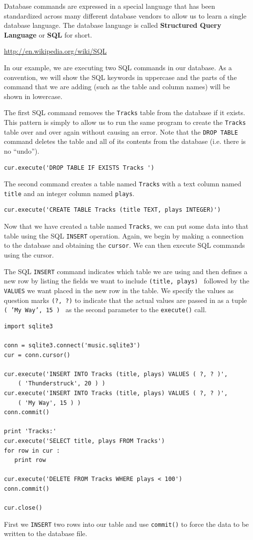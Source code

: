 \documentclass[11pt]{book}
\begin{document}
Database commands are expressed in a special language that has 
been standardized across many different database vendors 
to allow us to learn a single database language.   The database
language is called {\bf Structured Query Language} or {\bf SQL}
for short.

\url{http://en.wikipedia.org/wiki/SQL}

In our example, we are executing two SQL commands in our database.
As a convention, we will show the SQL keywords in uppercase 
and the parts of the command that we are adding (such as the
table and column names) will be shown in lowercase.

The first SQL command removes the {\tt Tracks} table from the 
database if it exists.  This pattern is simply to allow us to 
run the same program to create the {\tt Tracks} table over 
and over again without causing an error.  Note that the
{\tt DROP TABLE} command deletes the table and all of its contents
from the database (i.e. there is no ``undo'').

\beforeverb
\begin{verbatim}
cur.execute('DROP TABLE IF EXISTS Tracks ')
\end{verbatim}
\afterverb
%
The second command creates a table named
{\tt Tracks} with a text column named {\tt title}
and an integer column named {\tt plays}.

\beforeverb
\begin{verbatim}
cur.execute('CREATE TABLE Tracks (title TEXT, plays INTEGER)')
\end{verbatim}
\afterverb
%
Now that we have created a table named {\tt Tracks}, we can put some data
into that table using the SQL {\tt INSERT} operation.   Again, we begin
by making a connection to the database and obtaining the {\tt cursor}.
We can then execute SQL commands using the cursor.

The SQL {\tt INSERT} command indicates which table we are using 
and then defines a new row by listing the fields we want to 
include {\tt (title, plays) } followed by the {\tt VALUES} we want
placed in the new row in the table.   We specify the values
as question marks {\tt (?, ?)} to indicate that the actual 
values are passed in as a tuple {\tt ( 'My Way', 15 ) } as the
second parameter to the {\tt execute()} call.

\beforeverb
\begin{verbatim}
import sqlite3

conn = sqlite3.connect('music.sqlite3')
cur = conn.cursor()

cur.execute('INSERT INTO Tracks (title, plays) VALUES ( ?, ? )', 
    ( 'Thunderstruck', 20 ) )
cur.execute('INSERT INTO Tracks (title, plays) VALUES ( ?, ? )', 
    ( 'My Way', 15 ) )
conn.commit()

print 'Tracks:'
cur.execute('SELECT title, plays FROM Tracks')
for row in cur :
   print row

cur.execute('DELETE FROM Tracks WHERE plays < 100')
conn.commit()

cur.close()
\end{verbatim}
\afterverb
%
First we {\tt INSERT} two rows into our table and use {\tt commit()} 
to force the data to be written to the database file.
\end{document}
